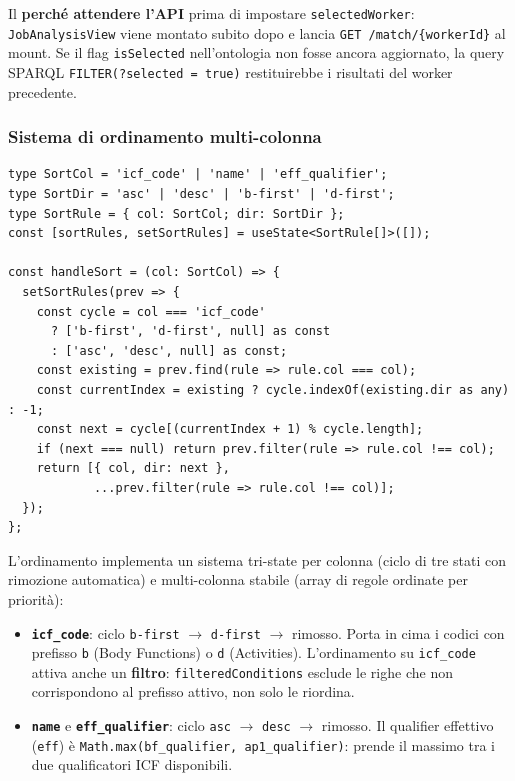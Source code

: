 \documentclass[a4paper,12pt]{article}
\begin{document}
Il \textbf{perch\'{e} attendere l'API} prima di impostare
\texttt{selectedWorker}: \texttt{JobAnalysisView} viene montato subito
dopo e lancia \texttt{GET /match/\{workerId\}} al mount. Se il flag
\texttt{isSelected} nell'ontologia non fosse ancora aggiornato,
la query SPARQL \texttt{FILTER(?selected = true)} restituirebbe i
risultati del worker precedente.

\subsubsection{Sistema di ordinamento multi-colonna}
\vspace{2pt}
\begin{lstlisting}
type SortCol = 'icf_code' | 'name' | 'eff_qualifier';
type SortDir = 'asc' | 'desc' | 'b-first' | 'd-first';
type SortRule = { col: SortCol; dir: SortDir };
const [sortRules, setSortRules] = useState<SortRule[]>([]);

const handleSort = (col: SortCol) => {
  setSortRules(prev => {
    const cycle = col === 'icf_code'
      ? ['b-first', 'd-first', null] as const
      : ['asc', 'desc', null] as const;
    const existing = prev.find(rule => rule.col === col);
    const currentIndex = existing ? cycle.indexOf(existing.dir as any) : -1;
    const next = cycle[(currentIndex + 1) % cycle.length];
    if (next === null) return prev.filter(rule => rule.col !== col);
    return [{ col, dir: next },
            ...prev.filter(rule => rule.col !== col)];
  });
};
\end{lstlisting}

\noindent L'ordinamento implementa un sistema tri-state per colonna (ciclo di
tre stati con rimozione automatica) e multi-colonna stabile (array
di regole ordinate per priorit\`{a}):
\begin{itemize}
  \item \textbf{\texttt{icf\_code}}: ciclo \texttt{b-first} $\rightarrow$
        \texttt{d-first} $\rightarrow$ rimosso. Porta in cima i codici
        con prefisso \texttt{b} (Body Functions) o \texttt{d} (Activities).
        L'ordinamento su \texttt{icf\_code} attiva anche un \textbf{filtro}:
        \texttt{filteredConditions} esclude le righe che non corrispondono
        al prefisso attivo, non solo le riordina.
  \item \textbf{\texttt{name}} e \textbf{\texttt{eff\_qualifier}}:
        ciclo \texttt{asc} $\rightarrow$ \texttt{desc} $\rightarrow$ rimosso.
        Il qualifier effettivo (\texttt{eff}) \`{e} \texttt{Math.max(bf\_\allowbreak{}qualifier, ap1\_\allowbreak{}qualifier)}:
        prende il massimo tra i due qualificatori ICF disponibili.
\end{itemize}
\end{document}
